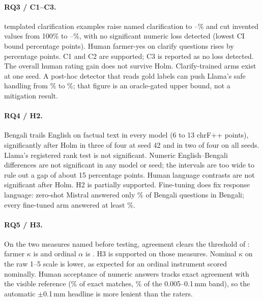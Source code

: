 \paragraph{RQ3 / C1--C3.}
\ClarifyTrainRows templated clarification examples raise named clarification to \RangeCLClarifyExactMin--\RangeCLClarifyExactMax\% and cut invented values from 100\% to \RangeCLInventedMin--\RangeCLInventedMax\%, with no significant numeric loss detected (lowest CI bound \SigAFourWorstLo percentage points). Human farmer-yes on clarify questions rises by \SigBThreeClVsFtClarifyDiff [\SigBThreeClVsFtClarifyDiffLo, \SigBThreeClVsFtClarifyDiffHi] percentage points. C1 and C2 are supported; C3 is reported as no loss detected. The overall human rating gain does not survive Holm. Clarify-trained arms exist at one seed. A post-hoc detector that reads gold labels can push Llama's safe handling from \DetLearnedPct\% to \DetCombinedPct\%; that figure is an oracle-gated upper bound, not a mitigation result.

\paragraph{RQ4 / H2.}
Bengali trails English on factual text in every model (6 to 13 chrF++ points), significantly after Holm in three of four at seed 42 and in two of four on all seeds. Llama's registered rank test is not significant. Numeric English--Bengali differences are not significant in any model or seed; the intervals are too wide to rule out a gap of about 15 percentage points. Human language contrasts are not significant after Holm. H2 is partially supported. Fine-tuning does fix response language: zero-shot Mistral answered only \LangMistralZSAll\% of Bengali questions in Bengali; every fine-tuned arm answered at least \RangeLangTunedMin\%.

\paragraph{RQ5 / H3.}
On the two measures named before testing, agreement clears the threshold of \AgreeThreshold: farmer $\kappa$ is \AgrKappaFarmer [\AgrKappaFarmerLo, \AgrKappaFarmerHi] and ordinal $\alpha$ is \AgrAlphaOrdinal [\AgrAlphaOrdinalLo, \AgrAlphaOrdinalHi]. H3 is supported on those measures. Nominal $\kappa$ on the raw 1--5 scale is lower, as expected for an ordinal instrument scored nominally. Human acceptance of numeric answers tracks exact agreement with the visible reference (\BinBExactYes\% of exact matches, \BinBPtOneYes\% of the 0.005--0.1\,mm band), so the automatic $\pm$0.1\,mm headline is more lenient than the raters.

